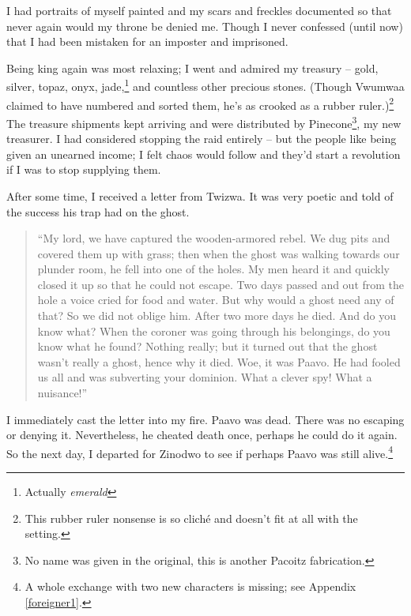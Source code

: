 I had portraits of myself painted and my scars and freckles documented so that never again would my throne be denied me. Though I never confessed (until now) that I had been mistaken for an imposter and imprisoned.

Being king again was most relaxing; I went and admired my treasury -- gold, silver, topaz, onyx, jade,\footnote{Actually \emph{emerald}} and countless other precious stones. (Though Vwumwaa claimed to have numbered and sorted them, he's as crooked as a rubber ruler.)\footnote{This rubber ruler nonsense is so clich\'{e} and doesn't fit at all with the setting.} The treasure shipments kept arriving and were distributed by Pinecone\footnote{No name was given in the original, this is another Pacoitz fabrication.}, my new treasurer. I had considered stopping the raid entirely -- but the people like being given an unearned income; I felt chaos would follow and they'd start a revolution if I was to stop supplying them.

After some time, I received a letter from Twizwa. It was very poetic and told of the success his trap had on the ghost.

\begin{quote}``My lord, we have captured the wooden-armored rebel. We dug pits and covered them up with grass; then when the ghost was walking towards our plunder room, he fell into one of the holes. My men heard it and quickly closed it up so that he could not escape. Two days passed and out from the hole a voice cried for food and water. But why would a ghost need any of that? So we did not oblige him. After two more days he died. And do you know what? When the coroner was going through his belongings, do you know what he found? Nothing really; but it turned out that the ghost wasn't really a ghost, hence why it died. Woe, it was Paavo. He had fooled us all and was subverting your dominion. What a clever spy! What a nuisance!''
\end{quote}

I immediately cast the letter into my fire. Paavo was dead. There was no escaping or denying it. Nevertheless, he cheated death once, perhaps he could do it again. So the next day, I departed for Zinodwo to see if perhaps Paavo was still alive.\footnote{A whole exchange with two new characters is missing; see Appendix \ref{foreigner1}.}
